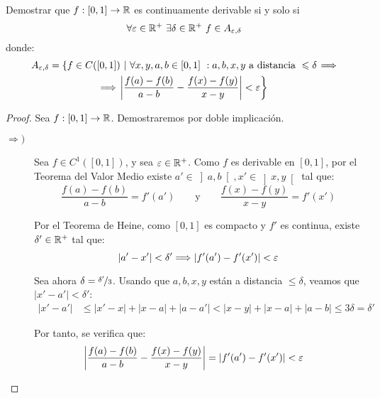     \begin{ejercicio}
        Demostrar que $f:[0,1]\to \mathbb{R}$ es continuamente derivable si y solo si
        \begin{equation*}
            \forall\varepsilon\in \mathbb{R}^+\ \exists\delta\in \mathbb{R}^+\ f\in A_{\varepsilon,\delta}
        \end{equation*}
        donde:
        \begin{multline*}
            A_{\varepsilon,\delta} = \left\{f\in C([0,1])\ \middle|\ \forall x,y,a,b\in [0,1]\ : a,b,x,y \text{ a distancia } \leqslant \delta\right. \Longrightarrow \\\Longrightarrow \left.\left|\frac{f(a)-f(b)}{a-b} - \frac{f(x)-f(y)}{x-y}\right| < \varepsilon\right\}
        \end{multline*}
        \begin{proof}
            Sea $f:[0,1]\to \mathbb{R}$. Demostraremos por doble implicación.
            \begin{description}
                \item[$\Longrightarrow)$] Sea $f\in C^1([0,1])$, y sea $\varepsilon\in \mathbb{R}^+$. Como $f$ es derivable en $[0,1]$, por el Teorema del Valor Medio existe $a'\in \left]a,b\right[, x'\in \left]x,y\right[$ tal que:
                \begin{equation*}
                    \frac{f(a)-f(b)}{a-b} = f'(a')\qquad \text{y}\qquad \frac{f(x)-f(y)}{x-y} = f'(x')
                \end{equation*}

                Por el Teorema de Heine, como $[0,1]$ es compacto y $f'$ es continua, existe $\delta'\in \mathbb{R}^+$ tal que:
                \begin{equation*}
                    |a'-x'| < \delta'
                    \Longrightarrow |f'(a') - f'(x')| < \varepsilon
                \end{equation*}

                Sea ahora $\delta = \nicefrac{\delta'}{3}$. Usando que $a,b,x,y$ están a distancia $\leq \delta$, veamos que $|x'-a'| < \delta'$:
                \begin{align*}
                    |x'-a'| &\leq |x'-x| + |x-a| + |a-a'|< |x-y| + |x-a| + |a-b|\leq 3\delta = \delta'
                \end{align*}

                Por tanto, se verifica que:
                \begin{align*}
                    \left|\frac{f(a)-f(b)}{a-b} - \frac{f(x)-f(y)}{x-y}\right| &= |f'(a') - f'(x')| < \varepsilon
                \end{align*}


\end{description}
\end{proof}
\end{ejercicio}
